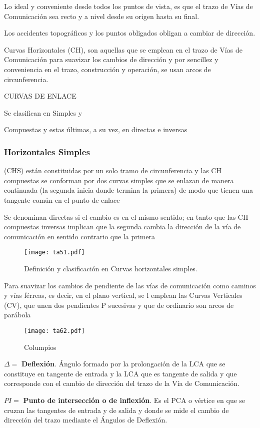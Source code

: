 Lo ideal y conveniente desde todos los puntos de vista, es que el trazo de Vías de Comunicación sea recto y a nivel desde su origen hasta su final.

Los accidentes topográficos y los puntos obligados obligan a cambiar de dirección.

Curvas Horizontales (CH), son aquellas que se emplean en el trazo de Vías de Comunicación para suavizar los cambios de dirección y por sencillez y conveniencia en el trazo, construcción y operación, se usan arcos de circunferencia.

CURVAS DE ENLACE

Se clasifican en Simples y

Compuestas y estas últimas, a su vez, en directas e inversas

\subsubsection{Horizontales Simples}

(CHS) están constituidas por un solo tramo de circunferencia y las CH compuestas se conforman por dos curvas simples que se enlazan de manera continuada (la segunda inicia donde termina la primera) de modo que tienen una tangente común en el punto de enlace

Se denominan directas si el cambio es en el mismo sentido; en tanto que las CH compuestas inversas implican que la segunda cambia la dirección de la vía de comunicación en sentido contrario que la primera
\begin{figure}[h!]
\centering
  \texttt{[image: ta51.pdf]}
  \caption{Definición y clasificación en Curvas horizontales simples.}
  \label{ta61}
\end{figure}
Para suavizar los cambios de pendiente de las vías de comunicación como caminos y vías férreas, es decir, en el plano vertical, se l emplean las Curvas Verticales (CV), que unen dos pendientes P sucesivas y que de ordinario son arcos de parábola
\begin{figure}[h!]
\centering
  \texttt{[image: ta62.pdf]}
  \caption{Columpios}
  \label{ta62}
\end{figure}

$\Delta=$ \textbf{Deflexión}. Ángulo formado por la prolongación de la LCA que se constituye en tangente de entrada y la LCA que es tangente de salida y que corresponde con el cambio de dirección del trazo de la Vía de Comunicación.

$PI=$ \textbf{Punto de intersección o de inflexión}. Es el PCA o vértice en que se cruzan las tangentes de entrada y de salida y donde se mide el cambio de dirección del trazo mediante el Ángulos de Deflexión.


